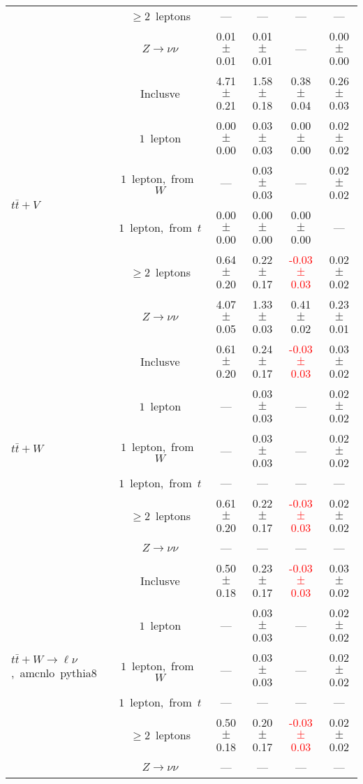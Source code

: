 \documentclass{article}
\begin{document}
\begin{longtable}{|l|c|c|c|c|c|}
 & $\ge2$~leptons  & ---  & ---  & ---  & --- \\* 
 & $Z\rightarrow\nu\nu$  & 0.01 $\pm$ 0.01  & 0.01 $\pm$ 0.01  & ---  & 0.00 $\pm$ 0.00 \\* 
\hline 
\multirow{6}{*}{$t\bar{t}+V$} & Inclusve  & 4.71 $\pm$ 0.21  & 1.58 $\pm$ 0.18  & 0.38 $\pm$ 0.04  & 0.26 $\pm$ 0.03 \\* 
 & $1$~lepton  & 0.00 $\pm$ 0.00  & 0.03 $\pm$ 0.03  & 0.00 $\pm$ 0.00  & 0.02 $\pm$ 0.02 \\* 
 & $1$~lepton,~from~$W$  & ---  & 0.03 $\pm$ 0.03  & ---  & 0.02 $\pm$ 0.02 \\* 
 & $1$~lepton,~from~$t$  & 0.00 $\pm$ 0.00  & 0.00 $\pm$ 0.00  & 0.00 $\pm$ 0.00  & --- \\* 
 & $\ge2$~leptons  & 0.64 $\pm$ 0.20  & 0.22 $\pm$ 0.17  & \textcolor{red}{ -0.03 $\pm$ 0.03 }  & 0.02 $\pm$ 0.02 \\* 
 & $Z\rightarrow\nu\nu$  & 4.07 $\pm$ 0.05  & 1.33 $\pm$ 0.03  & 0.41 $\pm$ 0.02  & 0.23 $\pm$ 0.01 \\* 
\hline 
\multirow{6}{*}{$t\bar{t}+W$} & Inclusve  & 0.61 $\pm$ 0.20  & 0.24 $\pm$ 0.17  & \textcolor{red}{ -0.03 $\pm$ 0.03 }  & 0.03 $\pm$ 0.02 \\* 
 & $1$~lepton  & ---  & 0.03 $\pm$ 0.03  & ---  & 0.02 $\pm$ 0.02 \\* 
 & $1$~lepton,~from~$W$  & ---  & 0.03 $\pm$ 0.03  & ---  & 0.02 $\pm$ 0.02 \\* 
 & $1$~lepton,~from~$t$  & ---  & ---  & ---  & --- \\* 
 & $\ge2$~leptons  & 0.61 $\pm$ 0.20  & 0.22 $\pm$ 0.17  & \textcolor{red}{ -0.03 $\pm$ 0.03 }  & 0.02 $\pm$ 0.02 \\* 
 & $Z\rightarrow\nu\nu$  & ---  & ---  & ---  & --- \\* 
\hline 
\multirow{6}{*}{$t\bar{t}+W{\rightarrow}{\ell}{\nu}$,~amcnlo~pythia8} & Inclusve  & 0.50 $\pm$ 0.18  & 0.23 $\pm$ 0.17  & \textcolor{red}{ -0.03 $\pm$ 0.03 }  & 0.03 $\pm$ 0.02 \\* 
 & $1$~lepton  & ---  & 0.03 $\pm$ 0.03  & ---  & 0.02 $\pm$ 0.02 \\* 
 & $1$~lepton,~from~$W$  & ---  & 0.03 $\pm$ 0.03  & ---  & 0.02 $\pm$ 0.02 \\* 
 & $1$~lepton,~from~$t$  & ---  & ---  & ---  & --- \\* 
 & $\ge2$~leptons  & 0.50 $\pm$ 0.18  & 0.20 $\pm$ 0.17  & \textcolor{red}{ -0.03 $\pm$ 0.03 }  & 0.02 $\pm$ 0.02 \\* 
 & $Z\rightarrow\nu\nu$  & ---  & ---  & ---  & --- \\* 

\end{longtable}
\end{document}
